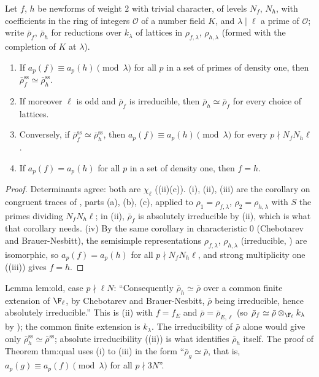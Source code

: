 \begin{corollary}\label{cor:modgalrep:congruent-newforms}
Let $f$, $h$ be newforms of weight $2$ with trivial character, of levels $N_f$, $N_h$, with coefficients in the ring of integers $\mathcal{O}$ of a number field
$K$, and $\lambda\mid\ell$ a prime of $\mathcal{O}$; write $\bar\rho_f$, $\bar\rho_h$ for reductions over $k_\lambda$ of lattices in $\rho_{f,\lambda}$, $\rho_{h,\lambda}$ (formed with the
completion of $K$ at $\lambda$).
\begin{enumerate}[label=(\roman*)]
\item If $a_p(f)\equiv a_p(h)\pmod\lambda$ for all $p$ in a set of primes of density one, then $\bar\rho_f^{\mathrm{ss}}\simeq\bar\rho_h^{\mathrm{ss}}$.
\item If moreover $\ell$ is odd and $\bar\rho_f$ is irreducible, then $\bar\rho_h\simeq\bar\rho_f$ for every choice of lattices.
\item Conversely, if $\bar\rho_f^{\mathrm{ss}}\simeq\bar\rho_h^{\mathrm{ss}}$, then $a_p(f)\equiv a_p(h)\pmod\lambda$ for every $p\nmid N_fN_h\ell$.
\item If $a_p(f)=a_p(h)$ for all $p$ in a set of density one, then $f=h$.
\end{enumerate}
\end{corollary}

\begin{proof}
Determinants agree: both are $\chi_\ell$ ((ii)(c)). (i), (ii), (iii) are the corollary on congruent traces of
, parts (a), (b), (c), applied to $\rho_1=\rho_{f,\lambda}$, $\rho_2=\rho_{h,\lambda}$ with $S$ the primes dividing $N_fN_h\ell$; in (ii), $\bar\rho_f$ is absolutely
irreducible by (ii), which is what that corollary needs. (iv) By the same corollary in characteristic $0$ (Chebotarev
and Brauer-Nesbitt), the semisimple representations $\rho_{f,\lambda}$, $\rho_{h,\lambda}$ (irreducible, ) are isomorphic, so $a_p(f)=a_p(h)$
for all $p\nmid N_fN_h\ell$, and strong multiplicity one ((iii)) gives $f=h$.
\end{proof}

\begin{paperlink}
Lemma lem:old, case $p\nmid\ell N$: ``Consequently $\bar\rho_h\simeq\bar\rho$ over a common finite extension of $\F_\ell$, by Chebotarev and Brauer-Nesbitt, $\bar\rho$
being irreducible, hence absolutely irreducible.'' This is (ii) with $f=f_E$ and $\bar\rho=\bar\rho_{E,\ell}$ (so
$\bar\rho_f\simeq\bar\rho\otimes_{\F_\ell}k_\lambda$ by ); the common finite extension is $k_\lambda$. The irreducibility of $\bar\rho$ alone would
give only $\bar\rho_h^{\mathrm{ss}}\simeq\bar\rho^{\mathrm{ss}}$; absolute irreducibility ((ii)) is what identifies $\bar\rho_h$ itself. The proof of Theorem
thm:qual uses (i) to (iii) in the form ``$\bar\rho_g\simeq\bar\rho$, that is, $a_p(g)\equiv a_p(f)\pmod\lambda$ for all $p\nmid 3N$''.
\end{paperlink}

